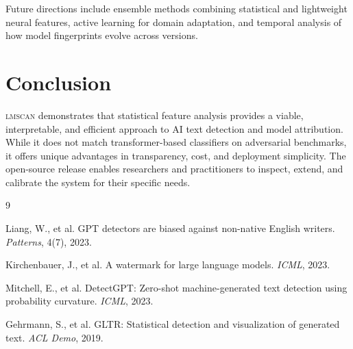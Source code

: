 \documentclass[11pt]{article}
\begin{document}
Future directions include ensemble methods combining statistical and lightweight neural features, active learning for domain adaptation, and temporal analysis of how model fingerprints evolve across versions.

\section{Conclusion}

\textsc{lmscan} demonstrates that statistical feature analysis provides a viable, interpretable, and efficient approach to AI text detection and model attribution. While it does not match transformer-based classifiers on adversarial benchmarks, it offers unique advantages in transparency, cost, and deployment simplicity. The open-source release enables researchers and practitioners to inspect, extend, and calibrate the system for their specific needs.


\begin{thebibliography}{9}

Liang, W., et al.
\newblock GPT detectors are biased against non-native English writers.
\newblock \emph{Patterns}, 4(7), 2023.

Kirchenbauer, J., et al.
\newblock A watermark for large language models.
\newblock \emph{ICML}, 2023.

Mitchell, E., et al.
\newblock DetectGPT: Zero-shot machine-generated text detection using probability curvature.
\newblock \emph{ICML}, 2023.

Gehrmann, S., et al.
\newblock GLTR: Statistical detection and visualization of generated text.
\newblock \emph{ACL Demo}, 2019.

\end{thebibliography}
\end{document}
